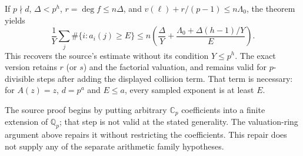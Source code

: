 If $p\nmid d$, $\Delta<p^h$, $r=\deg f\le n\Delta$, and
$v(\ell)+r/(p-1)\le n\Lambda_0$, the theorem yields
\[
 \frac1Y\sum_j\#\{i:a_i(j)\ge E\}
 \le n\left(\frac\Delta Y+
          \frac{\Lambda_0+\Delta(h-1)/Y}{E}\right).
\]
This recovers the source's estimate without its condition $Y\le p^h$.
The exact version retains $r$ (or $s$) and the factorial valuation,
and remains valid for $p$-divisible steps after adding the displayed
collision term.  That term is necessary: for $A(z)=z$, $d=p^a$
and $E\le a$, every sampled exponent is at least $E$.

The source proof begins by putting arbitrary $\mathbb C_p$
coefficients into a finite extension of $\mathbb Q_p$; that step
is not valid at the stated generality.  The valuation-ring argument
above repairs it without restricting the coefficients.  This repair
does not supply any of the separate arithmetic family hypotheses.
